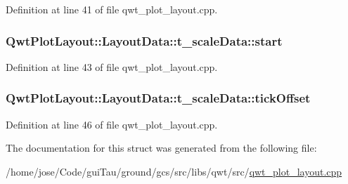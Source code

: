 Definition at line 41 of file qwt\-\_\-plot\-\_\-layout.\-cpp.

\hypertarget{struct_qwt_plot_layout_1_1_layout_data_1_1t__scale_data_accbeb074269039ebd7975ebcee56dc95}{
\subsubsection[{start}]{ Qwt\-Plot\-Layout\-::\-Layout\-Data\-::t\-\_\-scale\-Data\-::start}}\label{struct_qwt_plot_layout_1_1_layout_data_1_1t__scale_data_accbeb074269039ebd7975ebcee56dc95}


Definition at line 43 of file qwt\-\_\-plot\-\_\-layout.\-cpp.

\hypertarget{struct_qwt_plot_layout_1_1_layout_data_1_1t__scale_data_a1206f6357152ae0f7725e25c8443b263}{
\subsubsection[{tick\-Offset}]{ Qwt\-Plot\-Layout\-::\-Layout\-Data\-::t\-\_\-scale\-Data\-::tick\-Offset}}\label{struct_qwt_plot_layout_1_1_layout_data_1_1t__scale_data_a1206f6357152ae0f7725e25c8443b263}


Definition at line 46 of file qwt\-\_\-plot\-\_\-layout.\-cpp.



The documentation for this struct was generated from the following file\-:\begin{DoxyCompactItemize}
\item 
/home/jose/\-Code/gui\-Tau/ground/gcs/src/libs/qwt/src/\hyperlink{qwt__plot__layout_8cpp}{qwt\-\_\-plot\-\_\-layout.\-cpp}\end{DoxyCompactItemize}
